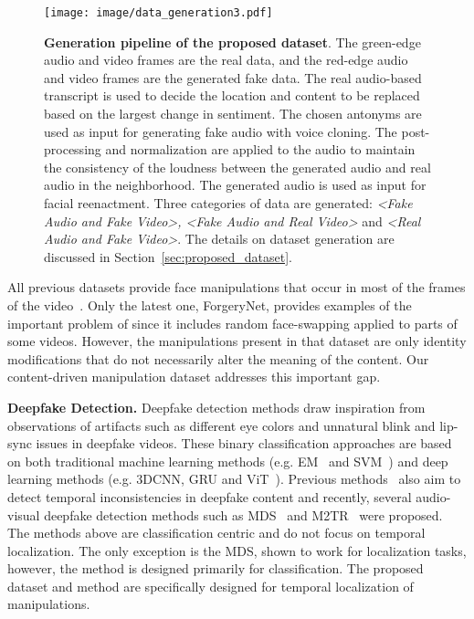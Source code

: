 \documentclass[conference, a4paper]{IEEEtran}
\makeatletter
\newcommand*{\eg}{e.g.\@\xspace}
\makeatother
\begin{document}
\begin{figure*}[t]
\centering
\texttt{[image: image/data\_generation3.pdf]}
\caption{\textbf{Generation pipeline of the proposed dataset}. The green-edge audio and video frames are the real data, and the red-edge audio and video frames are the generated fake data. The real audio-based transcript is used to decide the location and content to be replaced based on the largest change in sentiment. The chosen antonyms are used as input for generating fake audio with voice cloning. The post-processing and normalization are applied to the audio to maintain the consistency of the loudness between the generated audio and real audio in the neighborhood. The generated audio is used as input for facial reenactment. Three categories of data are generated: \textit{\textless Fake Audio and Fake Video\textgreater, \textless Fake Audio and Real Video\textgreater} and \textit{\textless Real Audio and Fake Video\textgreater}. The details on dataset generation are discussed in Section~\ref{sec:proposed_dataset}.}
\label{fig:data_generation}
\end{figure*}

All previous datasets provide face manipulations that occur in most of the frames of the video~\cite{chugh_not_2020}. Only the latest one, ForgeryNet, provides examples of the important problem of \tasklower{} since it includes random face-swapping applied to parts of some videos. However, the manipulations present in that dataset are only identity modifications that do not necessarily alter the meaning of the content. Our content-driven manipulation dataset addresses this important gap.

\noindent \textbf{Deepfake Detection.} Deepfake detection methods draw inspiration from observations of artifacts such as different eye colors and unnatural blink and lip-sync issues in deepfake videos. These binary classification approaches are based on both traditional machine learning methods (\eg EM~\cite{guarnera_deepfake_2020} and SVM~\cite{yang_exposing_2019}) and deep learning methods (\eg 3DCNN\cite{de_lima_deepfake_2020}, GRU\cite{montserrat_deepfakes_2020} and ViT~\cite{wodajo_deepfake_2021, heo_deepfake_2021, coccomini_combining_2022}). Previous methods~\cite{lewis_deepfake_2020, gu_spatiotemporal_2021} also aim to detect temporal inconsistencies in deepfake content and recently, several audio-visual deepfake detection methods such as MDS~\cite{chugh_not_2020} and M2TR~\cite{wang_m2tr_2021} were proposed. The methods above are classification centric and do not focus on temporal localization. The only exception is the MDS, shown to work for localization tasks, however, the method is designed primarily for classification. The proposed dataset and method are specifically designed for temporal localization of manipulations.
\end{document}
